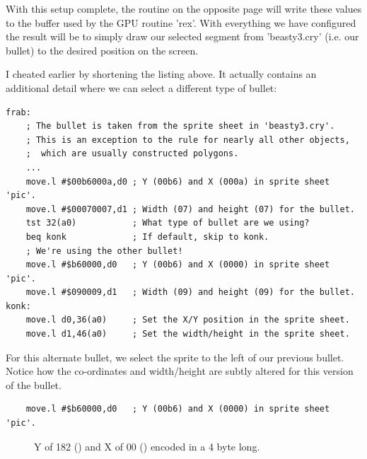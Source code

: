With this setup complete, the routine  on the opposite page will write these
values to the buffer used by the GPU routine 'rex'. With everything we have configured the result
will be to simply draw our selected segment from 'beasty3.cry' (i.e. our bullet) to the desired position on the screen.

I cheated earlier by shortening the  listing above. It actually contains an additional detail
where we can select a different type of bullet:
\begin{lstlisting}
frab:
    ; The bullet is taken from the sprite sheet in 'beasty3.cry'.
    ; This is an exception to the rule for nearly all other objects,
    ;  which are usually constructed polygons.
    ...
    move.l #$00b6000a,d0 ; Y (00b6) and X (000a) in sprite sheet 'pic'.
    move.l #$00070007,d1 ; Width (07) and height (07) for the bullet.
    tst 32(a0)           ; What type of bullet are we using?
    beq konk             ; If default, skip to konk.
    ; We're using the other bullet!
    move.l #$b60000,d0   ; Y (00b6) and X (0000) in sprite sheet 'pic'.
    move.l #$090009,d1   ; Width (09) and height (09) for the bullet.
konk:
    move.l d0,36(a0)     ; Set the X/Y position in the sprite sheet.
    move.l d1,46(a0)     ; Set the width/height in the sprite sheet.
\end{lstlisting}

For this alternate bullet, we select the sprite to the left of our previous bullet. Notice how the co-ordinates
and width/height are subtly altered for this version of the bullet.
\begin{lstlisting}
    move.l #$b60000,d0   ; Y (00b6) and X (0000) in sprite sheet 'pic'.
\end{lstlisting}
\begin{figure}[H]
  {
    \setlength{\tabcolsep}{3.0pt}
    \setlength\cmidrulewidth{\lightrulewidth} %
    \begin{adjustbox}{width=3cm,center}
    \end{adjustbox}
  \caption{Y of 182 () and X of 00 () encoded in a 4 byte long.}
  }
\end{figure}

